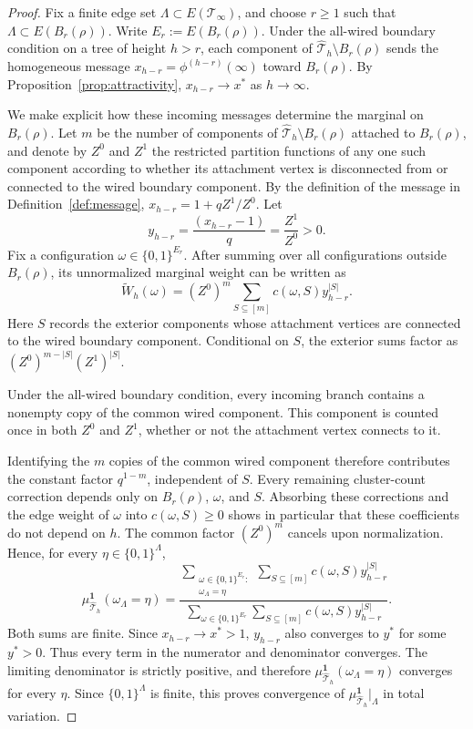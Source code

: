 \documentclass[11pt]{amsart}
\theoremstyle{plain}
\theoremstyle{definition}
\theoremstyle{remark}
\newcommand{\dreg}{\widehat {\mathcal T}_h}
\begin{document}
\begin{proof}
Fix a finite edge set $\Lambda\subset E(\mathcal T_\infty)$, and choose $r\ge1$ such that $\Lambda\subset E(B_r(\rho))$. Write $E_r:=E(B_r(\rho))$. Under the all-wired boundary condition on a tree of height $h>r$, each component of $\dreg\setminus B_r(\rho)$ sends the homogeneous message $x_{h-r}=\phi^{(h-r)}(\infty)$ toward $B_r(\rho)$. By Proposition~\ref{prop:attractivity}, $x_{h-r}\to x^*$ as $h\to\infty$.

We make explicit how these incoming messages determine the marginal on $B_r(\rho)$. Let $m$ be the number of components of $\dreg\setminus B_r(\rho)$ attached to $B_r(\rho)$, and denote by $Z^0$ and $Z^1$ the restricted partition functions of any one such component according to whether its attachment vertex is disconnected from or connected to the wired boundary component. By the definition of the message in Definition~\ref{def:message}, $x_{h-r}=1+q Z^1/Z^0$.
Let 
\[
    y_{h-r}=\frac{(x_{h-r}-1)}{q}=\frac{Z^1}{Z^0} > 0.
\] 
Fix a configuration $\omega\in\{0,1\}^{E_r}$. After summing over all configurations outside $B_r(\rho)$, its unnormalized marginal weight can be written as
\[
    \widetilde W_h(\omega)
    =
    (Z^0)^m
    \sum_{S\subseteq[m]}
    c(\omega,S)y_{h-r}^{|S|}.
\]
Here $S$ records the exterior components whose attachment vertices are connected to the wired boundary component. Conditional on $S$, the exterior sums factor as $(Z^0)^{m-|S|}(Z^1)^{|S|}$.

Under the all-wired boundary condition, every incoming branch contains a nonempty copy of the common wired component. This component is counted once in both $Z^0$ and $Z^1$, whether or not the attachment vertex connects to it.

Identifying the $m$ copies of the common wired component therefore contributes the constant factor $q^{1-m}$, independent of $S$. Every remaining cluster-count correction depends only on $B_r(\rho)$, $\omega$, and $S$. Absorbing these corrections and the edge weight of $\omega$ into $c(\omega,S)\ge0$ shows in particular that these coefficients do not depend on $h$. The common factor $(Z^0)^m$ cancels upon normalization. Hence, for every $\eta\in\{0,1\}^{\Lambda}$,
\[
    \mu_{\dreg}^{\mathbf 1}
    (\omega_\Lambda=\eta)
    =
    \frac{
        \displaystyle
        \sum_{\substack{
            \omega\in\{0,1\}^{E_r}:\\
            \omega_\Lambda=\eta
        }}
        \sum_{S\subseteq[m]}
        c(\omega,S)y_{h-r}^{|S|}
    }{
        \displaystyle
        \sum_{\omega\in\{0,1\}^{E_r}}
        \sum_{S\subseteq[m]}
        c(\omega,S)y_{h-r}^{|S|}
    }.
\]
Both sums are finite. Since $x_{h-r}\to x^*>1$, $y_{h-r}$ also converges to $y^*$ for some $y^*>0$. Thus every term in the numerator and denominator converges. The limiting denominator is strictly positive, and therefore $\mu_{\dreg}^{\mathbf 1}(\omega_\Lambda=\eta)$ converges for every $\eta$. Since $\{0,1\}^{\Lambda}$ is finite, this proves convergence of $\mu_{\dreg}^{\mathbf 1}\vert_\Lambda$ in total variation.


\end{proof}
\end{document}

